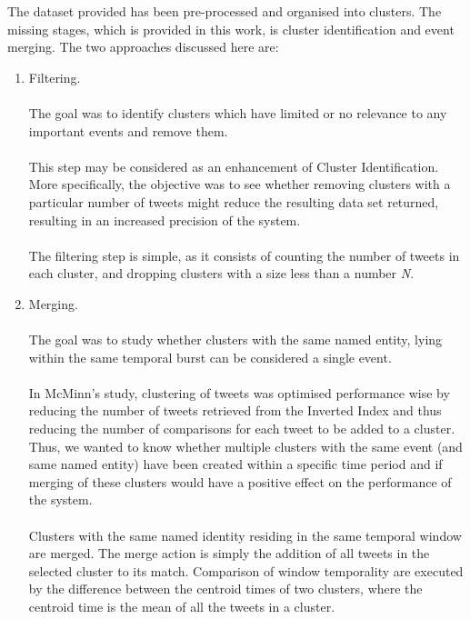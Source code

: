 \documentclass[a4paper,portrait,12pt]{article}
\begin{document}
The dataset provided has been pre-processed and organised into clusters.
The missing stages, which is provided in this work, is cluster identification and event merging.
The two approaches discussed here are:
\begin{enumerate}
	\item Filtering.\\
	      \\
	      The goal was to identify clusters which have limited or no relevance to any important events and remove them.\\
	      \\
	      This step may be considered as an enhancement of Cluster Identification.
	      More specifically, the objective was to see whether removing clusters with a particular number of tweets might reduce the resulting data set returned, resulting in an increased precision of the system. \\
	      \\
	      The filtering step is simple, as it consists of counting the number of tweets in each cluster, and dropping clusters with a size less than a number \textit{N}.

	\item Merging. \\
	      \\
	      The goal was to study whether clusters with the same named entity, lying within the same temporal burst can be considered a single event. \\
	      \\
	      In McMinn's study, clustering of tweets was optimised performance wise by reducing the number of tweets retrieved from the Inverted Index and thus reducing the number of comparisons for each tweet to be added to a cluster.
	      Thus, we wanted to know whether multiple clusters with the same event (and same named entity) have been created within a specific time period and if merging of these clusters would have a positive effect on the performance of the system. \\
	      \\
	      Clusters with the same named identity residing in the same temporal window are merged.
	      The merge action is simply the addition of all tweets in the selected cluster to its match.
		  Comparison of window temporality are executed by the difference between the centroid times of two clusters, where the centroid time is the mean of all the tweets in a cluster.\\
		  

\end{enumerate}
\end{document}
